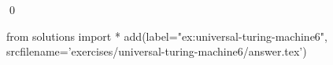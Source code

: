 
\begin{ex} 
  \label{ex:universal-turing-machine6}
  
  \qed
\end{ex} 
\begin{python0}
from solutions import *
add(label="ex:universal-turing-machine6",
    srcfilename='exercises/universal-turing-machine6/answer.tex') 
\end{python0}
